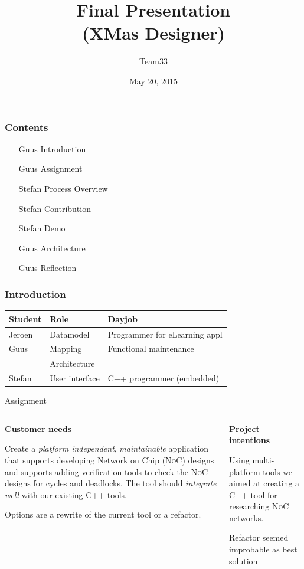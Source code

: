 \documentclass[11pt]{beamer}
\author{Team33}
\title{Final Presentation\\(XMas Designer)}
\institute{Open University/\\team033/\\Guus Bonnema, Stefan Versluys, Jeroen Kleijn}
\date{May 20, 2015}
\begin{document}
\newcommand{\Noc}{\textsc{NoC}\xspace}
\newcommand{\qt}{\textsc{Qt}\xspace}
\newcommand{\qml}{\textsc{Qml}\xspace}

\begin{frame}
	\titlepage
\end{frame}

\begin{frame}
	\frametitle{Contents}
	\begin{itemize}
		\item [Guus] Introduction 
		\item [Guus] Assignment
		\item [Stefan] Process Overview
		\item [Stefan] Contribution
		\item [Stefan] Demo
		\item [Guus] Architecture
		\item [Guus] Reflection
	\end{itemize}
	
\end{frame}

\begin{frame}
	\frametitle{Introduction}
	\begin{tabular}{lp{2.5cm}p{4cm}}
	\hline
	{\bf Student} & {\bf Role}      & {\bf Dayjob}\\\hline
	Jeroen        &  Datamodel      & Programmer for eLearning appl\\
	Guus		  &  Mapping        & Functional maintenance\\
	              &  Architecture   &                       \\
	Stefan        &  User interface & C++ programmer (embedded)\\
	\hline
	\end{tabular}
\end{frame}

\begin{frame}{Assignment}
	\begin{columns}
		\begin{column}[t]{5cm}
		{\bf Customer needs}

		Create a {\it platform independent}, {\it maintainable} application that supports
		developing Network on Chip (\Noc) designs and supports adding verification tools
		to check the \Noc designs for cycles and deadlocks. The tool should {\it integrate well}
		with our existing C++ tools.
		
		Options are a rewrite
		of the current tool or a refactor.
		\end{column}
		\begin{column}[t]{5cm}
		{\bf Project intentions}		
		
		Using multi-platform tools we aimed at creating a C++ tool for researching \Noc networks.
		
		Refactor seemed improbable as best solution
		\end{column}
	\end{columns}
\end{frame}
\end{document}
